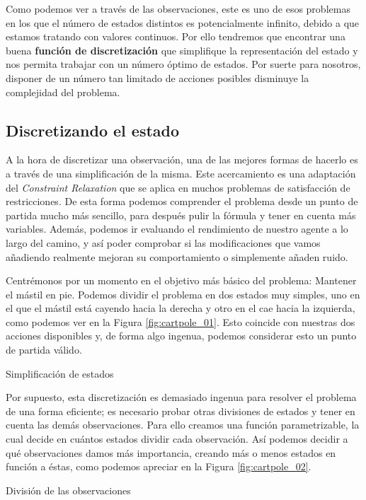 Como podemos ver a través de las observaciones, este es uno de esos problemas en los que el número de estados distintos es potencialmente infinito, debido a que estamos tratando con valores continuos. Por ello tendremos que encontrar una buena \textbf{función de discretización} que simplifique la representación del estado y nos permita trabajar con un número óptimo de estados. Por suerte para nosotros, disponer de un número tan limitado de acciones posibles disminuye la complejidad del problema.

\subsection{Discretizando el estado}
A la hora de discretizar una observación, una de las mejores formas de hacerlo es a través de una simplificación de la misma. Este acercamiento es una adaptación del \textit{Constraint Relaxation} que se aplica en muchos problemas de satisfacción de restricciones. De esta forma podemos comprender el problema desde un punto de partida mucho más sencillo, para después pulir la fórmula y tener en cuenta más variables. Además, podemos ir evaluando el rendimiento de nuestro agente a lo largo del camino, y así poder comprobar si las modificaciones que vamos añadiendo realmente mejoran su comportamiento o simplemente añaden ruido.

Centrémonos por un momento en el objetivo más básico del problema: Mantener el mástil en pie. Podemos dividir el problema en dos estados muy simples, uno en el que el mástil está cayendo hacia la derecha y otro en el cae hacia la izquierda, como podemos ver en la Figura \ref{fig:cartpole_01}. Esto coincide con nuestras dos acciones disponibles y, de forma algo ingenua, podemos considerar esto un punto de partida válido.

%
       {Simplificación de estados}

Por supuesto, esta discretización es demasiado ingenua para resolver el problema de una forma eficiente; es necesario probar otras divisiones de estados y tener en cuenta las demás observaciones. Para ello creamos una función parametrizable, la cual decide en cuántos estados dividir cada observación. Así podemos decidir a qué observaciones damos más importancia, creando más o menos estados en función a éstas, como podemos apreciar en la Figura \ref{fig:cartpole_02}.

%
       {División de las observaciones}

